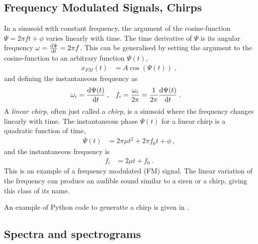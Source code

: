 \subsection{Frequency Modulated Signals, Chirps}
In a sinusoid with constant frequency, the argument of the cosine-function $\Psi = 2\pi f t + \phi$ varies linearly with time. The time derivative of $\Psi$ is its angular frequency $\omega =   \derivative{\Psi}{t} = 2 \pi f$.
This can be generalised by setting the argument to the cosine-function to an arbitrary function $\Psi(t)$,
\begin{align}
	x_{FM}(t) &= A \cos(\Psi(t)) \;,
\end{align}
and defining the instantaneous frequency as 
\begin{align}
	\omega_i &= \derivative{\Psi(t)}{t} \:, & f_i &= \frac{\omega_i}{2\pi} = \frac{1}{2\pi} \derivative{\Psi(t)}{t} \:.
\end{align}
A \emph{linear chirp}, often just called a \emph{chirp}, is a sinusoid where the frequency changes linearly with time. The instantaneous phase $\Psi(t)$ for a linear chirp is a quadratic function of time, 
\begin{align}
	\Psi(t) &= 2 \pi \mu t^2 + 2 \pi f_0 t + \phi  \:,
\end{align}
and the instantaneous frequency is 
\begin{align}
	f_i &=  2\mu t + f_0 \:.
\end{align}
This is an example of a frequency modulated (FM) signal. 
The linear variation of the frequency can produce an audible sound similar to a siren or a chirp, giving this class of its name.

An example of Python code to generatte a chirp is given in .



\subsection{Spectra and spectrograms}


